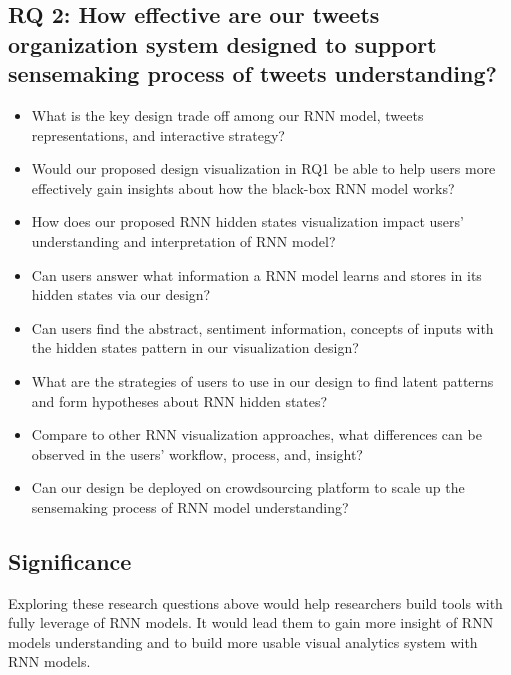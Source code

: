     
\subsection{RQ 2: How effective are our tweets organization system designed to support sensemaking process of tweets  understanding? }

\begin{itemize}

    \item What is the key design trade off among our RNN model, tweets representations, and interactive strategy?

    \item Would our proposed design visualization in RQ1 be able to help users more effectively gain insights about how the black-box RNN model works? 

    \item How does our proposed RNN hidden states visualization impact users’ understanding and interpretation of RNN model?
    
    \item Can users answer what information a RNN model learns and stores in its hidden states via our design?
    
    \item Can users find the abstract, sentiment information, concepts of inputs with the hidden states pattern in our visualization design?
    
    \item What are the strategies of users to use in our design to find latent patterns and form hypotheses about RNN hidden states?
    
    \item Compare to other RNN visualization approaches\cite{Strobelt2016}, what differences can be observed in the users’ workflow, process, and, insight?
    
    \item Can our design be deployed on crowdsourcing platform to scale up the sensemaking process of RNN model understanding?

\end{itemize}


\subsection{Significance}


Exploring these research questions above would help researchers build tools with fully leverage of RNN models. It would lead them to gain more insight of RNN models understanding and to build more usable visual analytics system with RNN models. 



